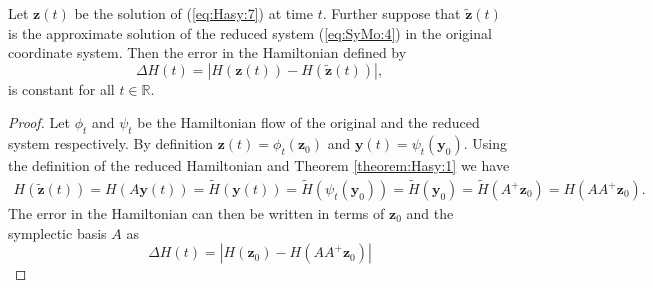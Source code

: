 \begin{proposition}
Let $\mathbf{z} (t)$ be the solution of (\ref{eq:Hasy:7}) at time $t$. Further suppose that $\tilde{\mathbf{z}} (t)$ is the approximate solution of the reduced system (\ref{eq:SyMo:4}) in the original coordinate system. Then the error in the Hamiltonian defined by
\begin{equation} \label{eq:SyMo:5}
	\Delta H(t)  = |H(\mathbf z(t)) - H(\tilde{\mathbf z}(t))|,
\end{equation}
is constant for all $t\in \mathbb R$.
\end{proposition}

\begin{proof}
	Let $\phi_t$ and $\psi_t$ be the Hamiltonian flow of the original and the reduced system respectively. By definition $\mathbf z(t) = \phi_t(\mathbf z_0)$ and $\mathbf y(t) = \psi_t(\mathbf y_0)$. Using the definition of the reduced Hamiltonian and Theorem \ref{theorem:Hasy:1} we have
\begin{equation} \label{eq:SyMo:6}
\begin{aligned}
	H(\tilde{\mathbf{z}} (t)) = H( A\mathbf y (t) ) = \tilde H(\mathbf y (t)) = \tilde H(\psi_t(\mathbf y_0)) = \tilde H(\mathbf y_0) = \tilde H(A^+ \mathbf z_0) = H(AA^+\mathbf z_0).
\end{aligned}
\end{equation}
The error in the Hamiltonian can then be written in terms of $\mathbf z_0$ and the symplectic basis $A$ as
\begin{equation} \label{eq:SyMo:7}
	\Delta H(t) = |H(\mathbf z_0) - H(AA^+\mathbf z_0)|
\end{equation}
\end{proof}

